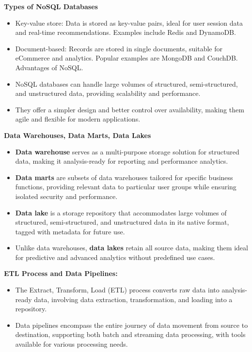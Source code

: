 \documentclass[12pt]{report} %
\begin{document}
	\noindent \textbf{Types of NoSQL Databases}
	\begin{itemize}
		\item Key-value store: Data is stored as key-value pairs, ideal for user session data and real-time recommendations. Examples include Redis and DynamoDB.
		\item Document-based: Records are stored in single documents, suitable for eCommerce and analytics. Popular examples are MongoDB and CouchDB.
		Advantages of NoSQL.
		\item NoSQL databases can handle large volumes of structured, semi-structured, and unstructured data, providing scalability and performance.
		\item They offer a simpler design and better control over availability, making them agile and flexible for modern applications.
	\end{itemize}


	\noindent \textbf{Data Warehouses, Data Marts, Data Lakes}
	\begin{itemize}
		\item \textbf{Data warehouse} serves as a multi-purpose storage solution for structured data, making it analysis-ready for reporting and performance analytics.
		\item  \textbf{Data marts} are subsets of data warehouses tailored for specific business functions, providing relevant data to particular user groups while ensuring isolated security and
		 performance.
		 \item \textbf{Data lake} is a storage repository that accommodates large volumes of structured, semi-structured, and unstructured data in its native format, tagged with metadata for future use.
		 \item Unlike data warehouses, \textbf{data lakes} retain all source data, making them ideal for predictive and advanced analytics without predefined use cases.
	\end{itemize}

	\noindent \textbf{ETL Process and Data Pipelines:}
		\begin{itemize}
			\item The Extract, Transform, Load (ETL) process converts raw data into analysis-ready data, involving data extraction, transformation, and loading into a repository.
			\item Data pipelines encompass the entire journey of data movement from source to destination, supporting both batch and streaming data processing, with tools available for various processing needs.
		\end{itemize}
	
\end{document}
